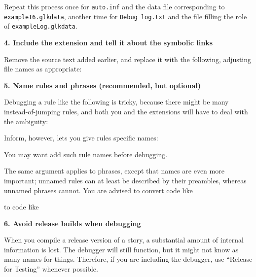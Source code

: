 \documentclass{book}
\newcommand{\lastpagebreak}{\vfill\pagebreak}
\begin{document}
Repeat this process once for \texttt{auto.inf} and the data file corresponding
to \texttt{exampleI6.glkdata}, another time for \texttt{Debug log.txt} and the
file filling the role of \texttt{exampleLog.glkdata}.

\lastpagebreak

\textbf{4. Include the extension and tell it about the symbolic links}

Remove the source text added earlier, and replace it with the following,
adjusting file names as appropriate:

\begin{quote}
  
\end{quote}

\textbf{5. Name rules and phrases (recommended, but optional)}

Debugging a rule like the following is tricky, because there might be many
instead-of-jumping rules, and both you and the extensions will have to deal with
the ambiguity:

\begin{quote}
  
\end{quote}

Inform, however, lets you give rules specific names:

\begin{quote}
  
\end{quote}

You may want add such rule names before debugging.

The same argument applies to phrases, except that names are even more important;
unnamed rules can at least be described by their preambles, whereas unnamed
phrases cannot.  You are advised to convert code like

\begin{quote}
  
\end{quote}

to code like

\begin{quote}
  
\end{quote}

\textbf{6. Avoid release builds when debugging}

When you compile a release version of a story, a substantial amount of internal
information is lost.  The debugger will still function, but it might not know as
many names for things.  Therefore, if you are including the debugger, use
``Release for Testing'' whenever possible.
\end{document}
